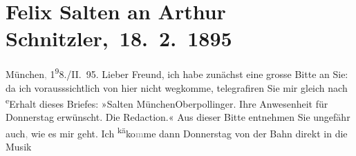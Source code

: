 

         
         \renewcommand{\erwaehntePersonen}{Personen: Hermann Bahr, Richard Beer-Hofmann, Otto Brahm, Julius von Gans-Ludassy, Hugo von Hofmannsthal, Maria Charlotte Lamberg, Charlotte Pohl-Glas}
         \renewcommand{\erwaehnteInstitutionen}{Institutionen: Deutsches Theater Berlin, Wiener Musik- und Theatergesellschaft}
         \renewcommand{\erwaehnteOrte}{Orte: Hotel Oberpollinger, München, Volkstheater, Wien}
         \renewcommand{\erwaehnteWerke}{Werke: Adele Sandrock, Die Zeit. Wiener Wochenschrift, Liebelei. Schauspiel in drei Akten}
               \section[ Felix Salten an Arthur Schnitzler, 18. 2. 1895]{ Felix Salten an Arthur Schnitzler, 18. 2. 1895}\nopagebreak{}\rehead{ }\begin{ledgroupsized}[t]{13cm}\normalsize\beginnumbering \toendnotes[C]{\smallbreak\pagebreak[2]} 
\toendnotes[C]{\smallbreak}\pstart
           \raggedleft{}{\pb}München\textcolor{gray}{,}{ }1\substVorne{}\textsuperscript{9}\substDazwischen{}8\substHinten{}./II. 95.\pend
           \pstart
           Lieber Freund, ich habe zunächst eine grosse Bitte an
               Sie: da ich vorausssichtlich von hier nicht wegkomme, telegrafiren Sie mir gleich nach \substVorne{}\textsuperscript{e}\substDazwischen{}E\substHinten{}rhalt dieses Briefes: »Salten MünchenOberpollinger. Ihre Anwesenheit für Donnerstag erwünscht. Die Redaction.«\pend
           \pstart
           Aus dieser Bitte entnehmen Sie ungefähr auch\textcolor{gray}{,} wie es mir geht. Ich \substVorne{}\textsuperscript{kä}\substDazwischen{}ko\textcolor{gray}{m}\substHinten{}me dann Donnerstag von der Bahn direkt in die
                  Musik {\kaufmannsund}

\end{ledgroupsized}
